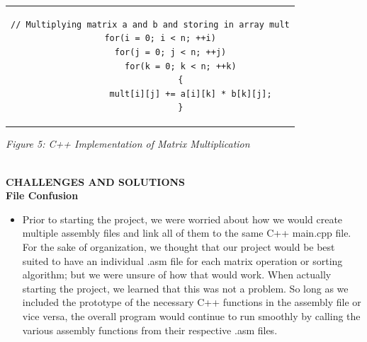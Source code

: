 \documentclass[twoside]{article}
\begin{document}
\begin{center} \begin{tabular}{c} \begin{lstlisting}
// Multiplying matrix a and b and storing in array mult
    for(i = 0; i < n; ++i)
        for(j = 0; j < n; ++j)
            for(k = 0; k < n; ++k)
            {
                mult[i][j] += a[i][k] * b[k][j];
            }
\end{lstlisting} \end{tabular} \end{center}
\begin{center}\textit{Figure 5: C++ Implementation of Matrix Multiplication}\end{center}


\noindent \\ \textbf{CHALLENGES AND SOLUTIONS}
\noindent \\ \textbf{File Confusion}
\begin{itemize}
\item Prior to starting the project, we were worried about how we would create multiple assembly files and link all of them to the same C++ main.cpp file. For the sake of organization, we thought that our project would be best suited to have an individual .asm file for each matrix operation or sorting algorithm; but we were unsure of how that would work. When actually starting the project, we learned that this was not a problem. So long as we included the prototype of the necessary C++ functions in the assembly file or vice versa, the overall program would continue to run smoothly by calling the various assembly functions from their respective .asm files.
\end{itemize}
\end{document}

